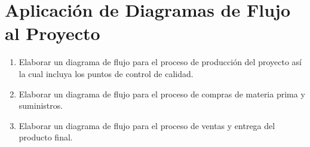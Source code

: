\documentclass[../main]{subfiles}
\begin{document}
\chapter{Aplicación de Diagramas de Flujo al Proyecto}
\begin{enumerate}
  \item Elaborar un diagrama de flujo para el proceso de producción
    del proyecto así la cual incluya los puntos de control de calidad.
  \item Elaborar un diagrama de flujo para el proceso de compras de
    materia prima y suministros.
  \item Elaborar un diagrama de flujo para el proceso de ventas y entrega del producto final.
\end{enumerate}
\end{document}
